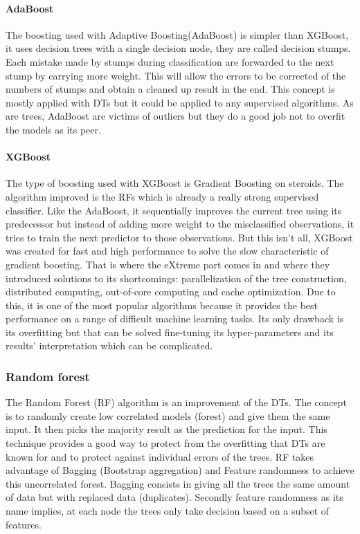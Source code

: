 \paragraph{AdaBoost}
The boosting used with Adaptive Boosting(AdaBoost) is simpler than XGBoost, it uses decision trees with a single decision node, they are called decision stumps. Each mistake made by stumps during classification are forwarded to the next stump by carrying more weight. This will allow the errors to be corrected of the numbers of stumps and obtain a cleaned up result in the end. This concept is mostly applied with DTs but it could be applied to any supervised algorithms. As are trees, AdaBoost are victims of outliers but they do a good job not to overfit the models as its peer. 

\paragraph{XGBoost}
The type of boosting used with XGBoost \cite{xgboost} is Gradient Boosting on steroids. The algorithm improved is the RFs which is already a really strong supervised classifier. Like the AdaBoost, it sequentially improves the current tree using its predecessor but instead of adding more weight to the misclassified observations, it tries to train the next predictor to those observations. But this isn't all, XGBoost was created for fast and high performance to solve the slow characteristic of gradient boosting. That is where the eXtreme part comes in and where they introduced solutions to its shortcomings: parallelization of the tree construction,  distributed computing, out-of-core computing and cache optimization. Due to this, it is one of the most popular algorithms because it provides the best performance on a range of difficult machine learning tasks. Its only drawback is its overfitting but that can be solved fine-tuning its hyper-parameters and its results' interpretation which can be complicated.

\subsubsection{Random forest}
The Random Forest (RF) algorithm is an improvement of the DTs. The concept is to randomly create low correlated models (forest) and give them the same input. It then picks the majority result as the prediction for the input. This technique provides a good way to protect from the overfitting that DTs are known for and to protect against individual errors of the trees. RF takes advantage of Bagging (Bootstrap aggregation) and Feature randomness to achieve this uncorrelated forest.
Bagging consists in giving all the trees the same amount of data but with replaced data (duplicates). Secondly feature randomness as its name implies, at each node the trees only take decision based on a subset of features\cite{rf}.


